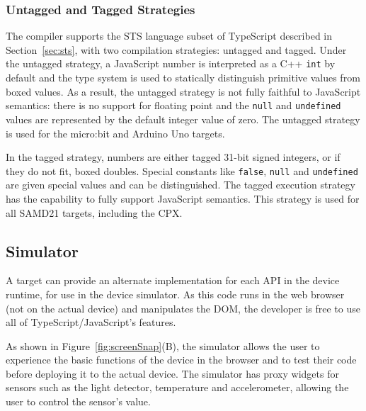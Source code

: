 \subsubsection{Untagged and Tagged Strategies}\label{sec:untagged-tagged}

The \MC compiler supports the STS language subset of TypeScript described in Section~\ref{sec:sts},
with two compilation strategies: untagged and tagged. Under the untagged strategy,
a JavaScript number is interpreted as a C++ \texttt{int} by default and the type system is used
to statically distinguish primitive values from boxed values. As a result, the untagged
strategy is not fully faithful to JavaScript semantics: there is no support for floating
point and the \texttt{null} and \texttt{undefined} values are represented by the default integer value of zero. The untagged strategy is used for the micro:bit and Arduino Uno targets.

In the tagged strategy, numbers are either tagged 31-bit signed integers, or if they do not fit,
boxed doubles. Special constants like \texttt{false}, \texttt{null} and \texttt{undefined} are given special values
and can be distinguished. The tagged execution strategy has the capability to fully support
JavaScript semantics. This strategy is used for all SAMD21 targets, including the CPX.


\subsection{Simulator}

A \MC target can provide an alternate implementation for each API in the device runtime, for use in the device
simulator. As this code runs in the web browser (not on the actual device) and manipulates the DOM, the developer is free to
use all of TypeScript/JavaScript's features.

As shown in Figure~\ref{fig:screenSnap}(B), the simulator allows the user to experience the basic functions of the device
in the browser and to test their code
before deploying it to the actual device. The simulator has proxy widgets for sensors such as the
light detector, temperature and accelerometer, allowing the user to control the sensor's value.
